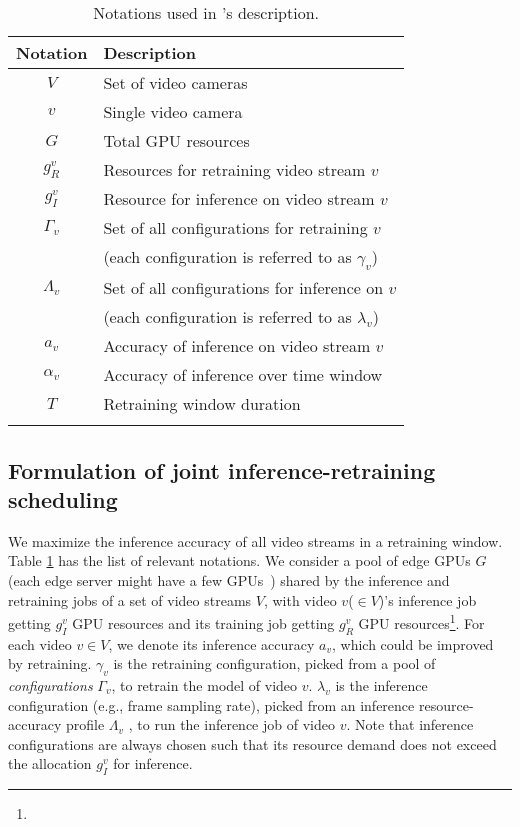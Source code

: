 \begin{table}[t!]
\small
\begin{tabular}{cl}
{\bf Notation} & {\bf Description}\\\hline
$V$ & Set of video cameras\\
$v$ & Single video camera\\\hline
$G$ & Total GPU resources\\
$g^v_R$ & Resources for retraining video stream $v$\\
$g^v_I$ & Resource for inference on video stream $v$\\\hline
$\Gamma_v$ & Set of all configurations for retraining $v$\\
 & (each configuration is referred to as $\gamma_v$)\\
$\Lambda_v$ & Set of all configurations for inference on $v$\\
 & (each configuration is referred to as $\lambda_v$)\\\hline
$a_v$ & Accuracy of inference on video stream $v$\\
$\alpha_v$ & Accuracy of inference over time window\\
$T$ & Retraining window duration\\\hline\\
\end{tabular}
\caption{\label{tab:notations}Notations used in {\name}'s description.}
\end{table}

\subsection{\hspace{-0.2cm}Formulation of joint inference-retraining scheduling}
\label{subsec:formulation}
We maximize the inference accuracy of all video streams in a retraining window. Table \ref{tab:notations} has the list of relevant notations.
We consider a pool of edge GPUs $G$ (each edge server might have a few GPUs~\cite{azure-ase}) shared by the inference and retraining jobs of a set of video streams $V$, with video $v$($\in V$)'s inference job getting $g^{v}_I$ GPU resources and its training job getting $g^{v}_R$ GPU resources\footnote{}. 
For each video $v \in V$, we denote its inference accuracy $a_v$, which could be improved by retraining.
$\gamma_v$ is the retraining configuration, picked from a pool of \textit{configurations} $\Gamma_v$, to retrain the model of video $v$.
$\lambda_v$ is the inference configuration (e.g., frame sampling rate), picked from an inference resource-accuracy profile $\Lambda_v$ \cite{videostorm, chameleon}, to run the inference job of video $v$.
Note that inference configurations are always chosen such that its resource demand does not exceed the allocation $g^v_I$ for inference.

